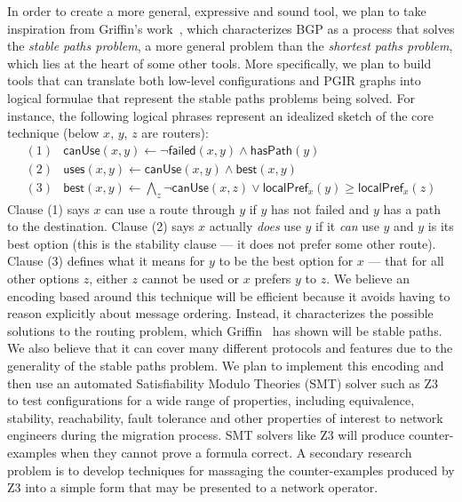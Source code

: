 In order to create a more general, expressive and sound tool, we plan to take inspiration from Griffin's work~\cite{griffin+:stable-paths},
which characterizes BGP as a process that solves the \emph{stable paths problem}, a more general problem than the
\emph{shortest paths problem}, which lies at the heart of some other tools.  
More specifically, we plan to build tools that can translate both low-level configurations and PGIR graphs into
logical formulae that represent the stable paths problems being solved.
For instance, the following logical phrases represent an idealized sketch of the core technique (below $x$, $y$, $z$ are routers):
%
\newcommand{\pfont}[1]{\mathsf{#1}}%
%
\[
\begin{array}{ll}
(1) & \pfont{canUse}(x,y) \leftarrow \neg \pfont{failed}(x,y) \wedge \pfont{hasPath}(y) \\
(2) & \pfont{uses}(x,y) \leftarrow \pfont{canUse}(x,y) \wedge \pfont{best}(x,y) \\
(3) & \pfont{best}(x,y) \leftarrow \bigwedge_z \neg \pfont{canUse}(x,z) \vee \pfont{localPref}_x(y) \ge \pfont{localPref}_x(z) 
\end{array}
\]
Clause (1) says $x$ can use a route through $y$ if $y$ has not failed and $y$ has a path to the destination. 
Clause (2) says $x$ actually \emph{does}
use $y$ if it \emph{can} use $y$ and $y$ is its best option (this is the stability clause --- it does not prefer some other
route).  Clause (3) defines what it means for $y$ to be the best option for $x$ --- that for all other options $z$, either
$z$ cannot be used or $x$ prefers $y$ to $z$.  We believe an encoding 
based around this technique will be efficient because it avoids having to reason
explicitly about message ordering.  Instead, it characterizes the possible solutions to the routing problem, which Griffin~\cite{griffin+:stable-paths} has shown will be stable paths.
We also believe that it can cover many different protocols and features due to the 
generality of the stable paths problem.  We plan to implement this encoding and then use an automated Satisfiability Modulo 
Theories (SMT) solver
such as Z3~\cite{z3} to test configurations for a wide range of properties, including equivalence, 
stability, reachability, fault tolerance and other properties of interest to network engineers during the
migration process.  SMT solvers like Z3 will produce counter-examples when they cannot prove a formula correct. A secondary
research problem is to develop techniques for massaging the counter-examples produced by Z3 into a simple form that may be presented
to a network operator.  


